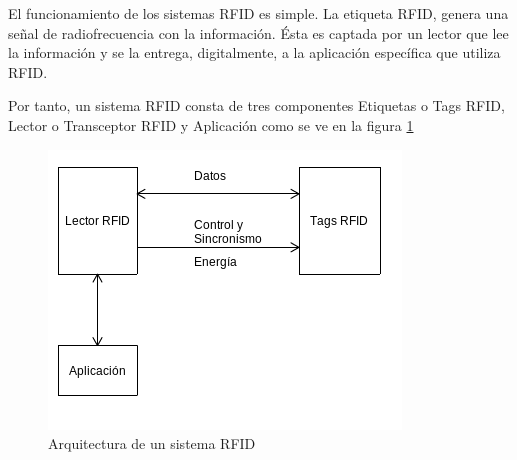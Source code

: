 El funcionamiento de los sistemas RFID es simple. La etiqueta RFID,  genera una señal de radiofrecuencia con la información. Ésta es captada por un lector que lee la información y se la entrega, digitalmente, a la aplicación específica que utiliza RFID.


Por tanto, un sistema RFID consta de tres componentes Etiquetas o Tags RFID, Lector o Transceptor RFID y Aplicación como  se ve en la figura \ref{arqui_RFID}  



\begin{figure}[H]
\centering
\includegraphics{images/capitulo2/arqui_RFID.png}
\caption{Arquitectura de un sistema RFID}
\label{arqui_RFID}
\end{figure}



